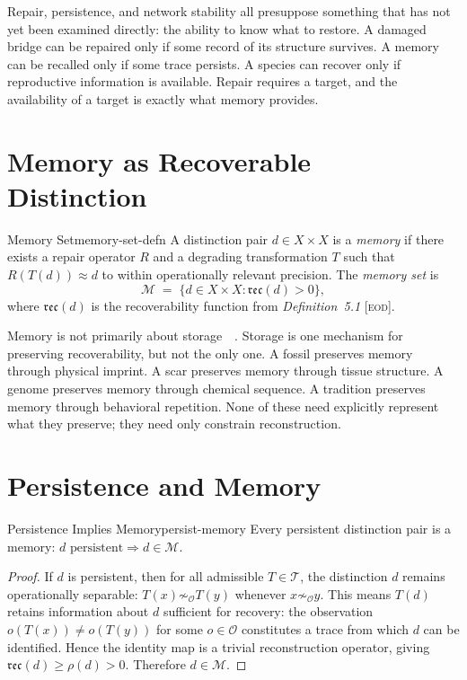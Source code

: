 \documentclass[12pt,twoside,openright]{book}
\newcommand{\reco}{\mathfrak{rec}}        %
\newcommand{\transfam}{\mathcal{T}}       %
\newcommand{\obs}{\mathcal{O}}
\newcommand{\survRatio}{\rho}             %
\newcommand{\EOD}[1]{\textit{#1} [\textsc{eod}]}
\providecommand{\memSet}{\mathcal{M}}
\begin{document}
Repair, persistence, and network stability all presuppose
something that has not yet been examined directly: the ability
to know what to restore. A damaged bridge can be repaired only
if some record of its structure survives. A memory can be
recalled only if some trace persists. A species can recover
only if reproductive information is available. Repair requires
a target, and the availability of a target is exactly what
memory provides.

\section{Memory as Recoverable Distinction}

\begin{definition}{Memory Set}{memory-set-defn}
A distinction pair $d\in X\times X$ is a \emph{memory} if
there exists a repair operator $R$ and a degrading
transformation $T$ such that $R(T(d))\approx d$ to within
operationally relevant precision. The \emph{memory set} is
\[
  \memSet
  \;=\;
  \bigl\{
    d\in X\times X : \reco(d)>0
  \bigr\},
\]
where $\reco(d)$ is the recoverability function from
\EOD{Definition~5.1}.
\end{definition}

Memory is not primarily about storage~\cite{kandel2006}~\cite{kandel2006}. Storage is one mechanism
for preserving recoverability, but not the only one. A fossil
preserves memory through physical imprint. A scar preserves
memory through tissue structure. A genome preserves memory
through chemical sequence. A tradition preserves memory through
behavioral repetition. None of these need explicitly represent
what they preserve; they need only constrain reconstruction.

\section{Persistence and Memory}

\begin{theorem}{Persistence Implies Memory}{persist-memory}
Every persistent distinction pair is a memory:
$d\text{ persistent}\Rightarrow d\in\memSet$.
\begin{proof}
If $d$ is persistent, then for all admissible $T\in\transfam$,
the distinction $d$ remains operationally separable:
$T(x)\not\sim_\obs T(y)$ whenever $x\not\sim_\obs y$.
This means $T(d)$ retains information about $d$ sufficient
for recovery: the observation $o(T(x))\neq o(T(y))$ for some
$o\in\obs$ constitutes a trace from which $d$ can be identified.
Hence the identity map is a trivial reconstruction operator,
giving $\reco(d)\ge\survRatio(d)>0$. Therefore $d\in\memSet$.
\end{proof}
\end{theorem}
\end{document}
